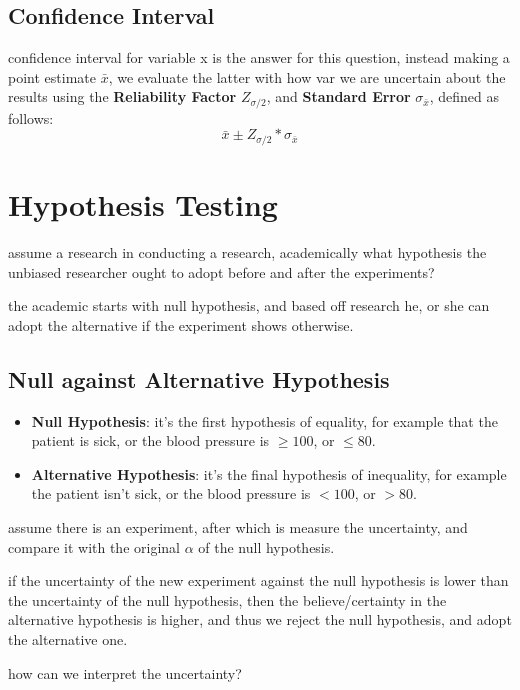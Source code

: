 \documentclass[4apaper,12pt]{book}
\begin{document}
\begin{description}
\begin{description}
      \subsection{Confidence Interval}
    \item confidence interval for variable x is the answer for this question, instead making a point estimate $\bar{x}$, we evaluate the latter with how var we are uncertain about the results using the \textbf{Reliability Factor} $Z_{\sigma/2}$, and \textbf{Standard Error} $\sigma_{\bar{x}}$, defined as follows:
      \begin{equation}  \bar{x} \pm Z_{\sigma/2} * \sigma_{\bar{x}} \end{equation}
    \end{description}
    \section{Hypothesis Testing}
    \begin{description}
    \item assume a research in conducting a research, academically what hypothesis the unbiased researcher ought to adopt before and after the experiments?
      \item the academic starts with null hypothesis, and based off research he, or she can adopt the alternative if the experiment shows otherwise.
      \subsection{Null against Alternative Hypothesis}
      \begin{itemize}
      \item \textbf{Null Hypothesis}: it's the first hypothesis of equality, for example that the patient is sick, or the blood pressure is $\geq100$, or $\leq80$.
        \item \textbf{Alternative Hypothesis}: it's the final hypothesis of inequality, for example the patient isn't sick, or the blood pressure is $<100$, or $>80$.
      \end{itemize}
    \item assume there is an experiment, after which is measure the uncertainty, and compare it with the original $\alpha$ of the null hypothesis.
    \item if the uncertainty of the new experiment against the null hypothesis is lower than the uncertainty of the null hypothesis, then the believe/certainty  in the alternative hypothesis is higher, and thus we reject the null hypothesis, and adopt the alternative one.
    \item how can we interpret the uncertainty?

\end{description}
\end{description}
\end{document}
